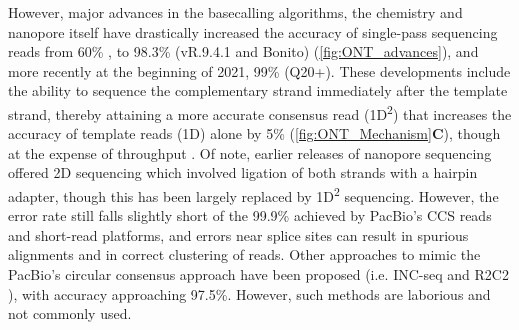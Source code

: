 However, major advances in the basecalling algorithms, the chemistry and nanopore itself have drastically increased the accuracy of single-pass sequencing reads from 60\% \cite{Jain2015}, to 98.3\% (vR.9.4.1 and Bonito) (\cref{fig:ONT_advances}), and more recently at the beginning of 2021, 99\% (Q20+)\cite{OxfordNanoporeTechnologiesplc.2021}. These developments include the ability to sequence the complementary strand immediately after the template strand, thereby attaining a more accurate consensus read (1D\textsuperscript{2}) that increases the accuracy of template reads (1D) alone by 5\%\cite{Rang2018} (\cref{fig:ONT_Mechanism}\textbf{C}), though at the expense of throughput \cite{NanoporeCommunityPosts}. Of note, earlier releases of nanopore sequencing offered 2D sequencing which involved ligation of both strands with a hairpin adapter, though this has been largely replaced by 1D\textsuperscript{2} sequencing. However, the error rate still falls slightly short of the 99.9\% achieved by PacBio's CCS reads and short-read platforms, and errors near splice sites can result in spurious alignments and in correct clustering of reads. Other approaches to mimic the PacBio's circular consensus approach have been proposed (i.e. INC-seq \cite{Li2016c} and R2C2 \cite{Volden2018}), with accuracy approaching 97.5\%. However, such methods are laborious and not commonly used.  

